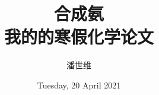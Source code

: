 \documentclass[a4paper,12pt]{article}
\begin{document}
\title {{合成氨}\\{\small 我的的寒假化学论文}}
\author{潘世维}
\date{Tuesday, 20 April 2021}

\maketitle
\end{document}
